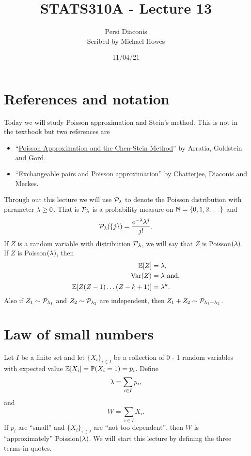 



\title{STATS310A - Lecture 13}
\author{Persi Diaconis\\ Scribed by Michael Howes}
\date{11/04/21}

\pagestyle{fancy}
\fancyhf{}


\maketitle
\tableofcontents
\section{References and notation}
Today we will study Poisson approximation and Stein's method. This is not in the textbook but two references are 
\begin{itemize}
    \item ``\href{https://projecteuclid.org/journals/statistical-science/volume-5/issue-4/Poisson-Approximation-and-the-Chen-Stein-Method/10.1214/ss/1177012015.full}{Poisson Approximation and the Chen-Stein Method}'' by Arratia, Goldstein and Gord.
    \item ``\href{https://arxiv.org/abs/math/0411525}{Exchangeable pairs and Poisson approximation}'' by Chatterjee, Diaconis and Meckes.
\end{itemize}
Through out this lecture we will use ${\mathcal{P}}_\lambda$ to denote the Poisson distribution with parameter $\lambda \ge 0$. That is ${\mathcal{P}}_\lambda$ is a probability measure on ${{\mathbb N}} = \{0,1,2,\ldots\}$ and 
\[{\mathcal{P}}_\lambda(\{j\}) = \frac{e^{-\lambda}\lambda^j}{j!}.\]
If $Z$ is a random variable with distribution ${\mathcal{P}}_\lambda$, we will say that $Z$ is Poisson$(\lambda)$. If $Z$ is Poisson$(\lambda)$, then 
\begin{align*}
    {\mathbb{E}}[Z]&=\lambda,\\
    \operatorname{Var}(Z)&=\lambda \text{ and},\\
    {\mathbb{E}}[Z(Z-1)\ldots(Z-k+1)]&=\lambda^k.
\end{align*}
Also if $Z_1 \sim {\mathcal{P}}_{\lambda_1}$ and $Z_2 \sim {\mathcal{P}}_{\lambda_2}$ are independent, then $Z_1+Z_2 \sim {\mathcal{P}}_{\lambda_1+\lambda_2}$.
\section{Law of small numbers}
Let $I$ be a finite set and let $\{X_i\}_{i \in I}$ be a collection of 0 - 1 random variables with expected value ${\mathbb{E}}[X_i]={\mathbb{P}}(X_i=1)=p_i$. Define
\[\lambda = \sum_{i\in I} p_i, \]
and 
\[W =\sum_{i \in I}X_i. \]
If $p_i$ are ``small'' and $\{X_i\}_{i \in I}$ are ``not too dependent'', then $W$ is ``approximately'' Poission$(\lambda)$. We will start this lecture by defining the three terms in quotes.
